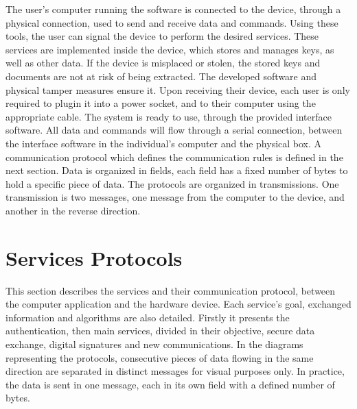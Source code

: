 The user's computer running the software is connected to the device, through a physical connection, used to send and receive data and commands.
Using these tools, the user can signal the device to perform the desired services.
These services are implemented inside the device, which stores and manages keys, as well as other data.
If the device is misplaced or stolen, the stored keys and documents are not at risk of being extracted. The developed software and physical tamper measures ensure it.
Upon receiving their device, each user is only required to plugin it into a power socket, and to their computer using the appropriate cable. The system is ready to use, through the provided interface software.
All data and commands will flow through a serial connection, between the interface software in the individual's computer and the physical box. A communication protocol which defines the communication rules is defined in the next section.
Data is organized in fields, each field has a fixed number of bytes to hold a specific piece of data.
The protocols are organized in transmissions. One transmission is two messages, one message from the computer to the device, and another in the reverse direction.

\section{Services Protocols}\label{chap:arch:services}

This section describes the services and their communication protocol, between the computer application and the hardware device. Each service's goal, exchanged information and algorithms are also detailed.
Firstly it presents the authentication, then main services, divided in their objective, secure data exchange, digital signatures and new communications.
In the diagrams representing the protocols, consecutive pieces of data flowing in the same direction are separated in distinct messages for visual purposes only. In practice, the data is sent in one message, each in its own field with a defined number of bytes.


